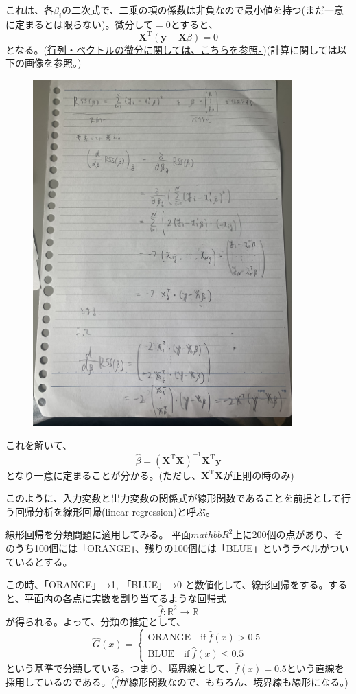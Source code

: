 \documentclass[uplatex]{jsarticle}
\begin{document}
これは、各$\beta_i$の二次式で、二乗の項の係数は非負なので最小値を持つ(まだ一意に定まるとは限らない)。微分して$=0$とすると、
\[
  \mathbf{X}^\mathrm{T}(\mathbf{y}-\mathbf{X}\beta)=0
\]
となる。(\href{https://qiita.com/AnchorBlues/items/8fe2483a3a72676eb96d}{行列・ベクトルの微分に関しては、こちらを参照。})(計算に関しては以下の画像を参照。)
\begin{figure}[htb]
  \includegraphics[width=100mm, angle=270]{fig-cal-2.jpg}
\end{figure}


これを解いて、
\[
  \hat{\beta}=(\mathbf{X}^\mathrm{T}\mathbf{X})^{-1}\mathbf{X}^\mathrm{T}\mathbf{y}
\]
となり一意に定まることが分かる。(ただし、$\mathbf{X}^\mathrm{T}\mathbf{X}$が正則の時のみ)

このように、入力変数と出力変数の関係式が線形関数であることを前提として行う回帰分析を線形回帰(linear regression)と呼ぶ。

線形回帰を分類問題に適用してみる。
平面$mathbb{R}^2$上に200個の点があり、そのうち100個には「ORANGE」、残りの100個には「BLUE」というラベルがついているとする。

この時、「ORANGE」→1, 「BLUE」→0 と数値化して、線形回帰をする。すると、平面内の各点に実数を割り当てるような回帰式
\[
  \hat{f} \colon \mathbb{R}^2 \to \mathbb{R}
\]
が得られる。よって、分類の推定として、
\[
  \hat{G}(x) =
  \begin{cases}
    \mbox{ORANGE} \quad \mathrm{if} \ \hat{f}(x) > 0.5 \\
    \mbox{BLUE}  \quad \mathrm{if} \ \hat{f}(x) \le 0.5
  \end{cases}
\]
という基準で分類している。つまり、境界線として、$\hat{f}(x)=0.5$という直線を採用しているのである。($\hat{f}$が線形関数なので、もちろん、境界線も線形になる。)
\end{document}
